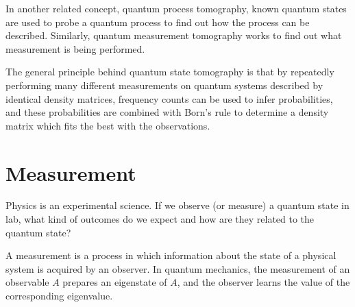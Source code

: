 \documentclass[onecolumn,pra,superscriptaddress,nofootinbib]{revtex4-1}
\begin{document}
In another related concept, quantum process tomography, known quantum states are used to probe a quantum process to find out how the process can be described. Similarly, quantum measurement tomography works to find out what measurement is being performed.

The general principle behind quantum state tomography is that by repeatedly performing many different measurements on quantum systems described by identical density matrices, frequency counts can be used to infer probabilities, and these probabilities are combined with Born's rule to determine a density matrix which fits the best with the observations.




\section{Measurement}
Physics is an experimental science. If we observe (or measure) a quantum state in lab, what kind of outcomes do we expect and how are they related to the quantum state?

A measurement is a process in which information about the state of a physical system is acquired by an observer. In quantum mechanics, the measurement of an observable $A$ prepares an eigenstate of $A$, and the observer learns the value of the corresponding eigenvalue.
\end{document}
